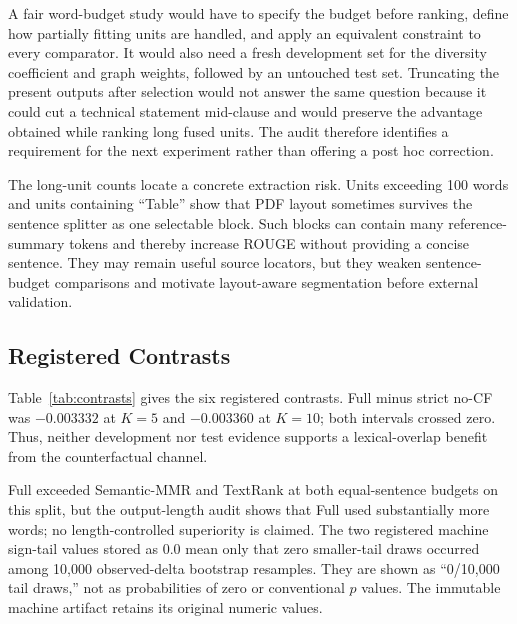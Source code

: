 \documentclass[applsci,article,submit,moreauthors]{Definitions/mdpi}
\begin{document}
A fair word-budget study would have to specify the budget before ranking, define how partially fitting units are handled, and apply an equivalent constraint to every comparator. It would also need a fresh development set for the diversity coefficient and graph weights, followed by an untouched test set. Truncating the present outputs after selection would not answer the same question because it could cut a technical statement mid-clause and would preserve the advantage obtained while ranking long fused units. The audit therefore identifies a requirement for the next experiment rather than offering a post hoc correction.

The long-unit counts locate a concrete extraction risk. Units exceeding 100 words and units containing ``Table'' show that PDF layout sometimes survives the sentence splitter as one selectable block. Such blocks can contain many reference-summary tokens and thereby increase ROUGE without providing a concise sentence. They may remain useful source locators, but they weaken sentence-budget comparisons and motivate layout-aware segmentation before external validation.

\subsection{Registered Contrasts}

Table~\ref{tab:contrasts} gives the six registered contrasts. Full minus strict no-CF was $-0.003332$ at $K=5$ and $-0.003360$ at $K=10$; both intervals crossed zero. Thus, neither development nor test evidence supports a lexical-overlap benefit from the counterfactual channel.

Full exceeded Semantic-MMR and TextRank at both equal-sentence budgets on this split, but the output-length audit shows that Full used substantially more words; no length-controlled superiority is claimed. The two registered machine sign-tail values stored as 0.0 mean only that zero smaller-tail draws occurred among 10,000 observed-delta bootstrap resamples. They are shown as ``0/10,000 tail draws,'' not as probabilities of zero or conventional $p$ values. The immutable machine artifact retains its original numeric values.
\end{document}
